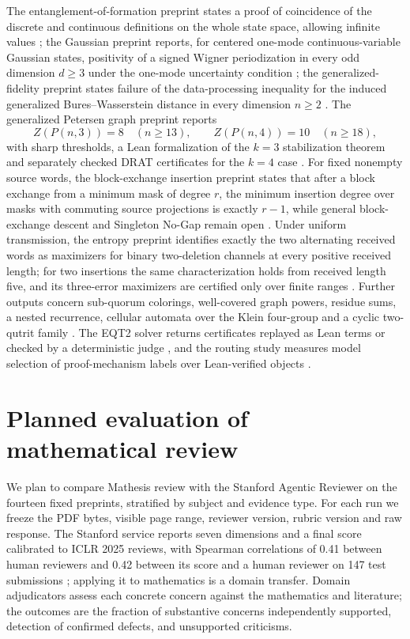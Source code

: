 \documentclass[11pt]{article}
\begin{document}
The entanglement-of-formation preprint states a proof of coincidence of the
discrete and continuous definitions on the whole state space, allowing
infinite values \citep{eof}; the Gaussian preprint reports, for centered
one-mode continuous-variable Gaussian states, positivity of a signed Wigner
periodization in every odd dimension $d\geq3$ under the one-mode uncertainty
condition \citep{gaussian}; the generalized-fidelity preprint states failure
of the data-processing inequality for the induced generalized
Bures--Wasserstein distance in every dimension $n\geq2$ \citep{fidelity}. The
generalized Petersen graph preprint reports
\begin{equation}
 Z(P(n,3))=8\quad(n\geq13),\qquad Z(P(n,4))=10\quad(n\geq18),
\end{equation}
with sharp thresholds, a Lean formalization of the $k=3$ stabilization theorem
and separately checked DRAT certificates for the $k=4$ case \citep{petersen}.
For fixed nonempty source words, the block-exchange insertion preprint states
that after a block exchange from a minimum mask of degree $r$, the minimum
insertion degree over masks with commuting source projections is exactly
$r-1$, while general block-exchange descent and Singleton No-Gap remain open
\citep{insertion}. Under uniform transmission, the entropy preprint identifies
exactly the two alternating received words as maximizers for binary
two-deletion channels at every positive received length; for two insertions
the same characterization holds from received length five, and its
three-error maximizers are certified only over finite ranges
\citep{entropy}. Further outputs concern sub-quorum colorings, well-covered
graph powers, residue sums, a nested recurrence, cellular automata over the
Klein four-group and a cyclic two-qutrit family
\citep{subquorum,wellcovered,residues,padovan,cellular,qutrit}. The EQT2
solver returns certificates replayed as Lean terms or checked by a
deterministic judge \citep{eqt2}, and the routing study measures model
selection of proof-mechanism labels over Lean-verified objects
\citep{routing}.

\section{Planned evaluation of mathematical review}
\label{app:study}
We plan to compare Mathesis review with the Stanford Agentic Reviewer on the
fourteen fixed preprints, stratified by subject and evidence type. For each
run we freeze the PDF bytes, visible page range, reviewer version, rubric
version and raw response. The Stanford service reports seven dimensions and
a final score calibrated to ICLR 2025 reviews, with Spearman correlations of
0.41 between human reviewers and 0.42 between its score and a human reviewer
on 147 test submissions \citep{stanford}; applying it to mathematics is a
domain transfer. Domain adjudicators assess each concrete concern against the
mathematics and literature; the outcomes are the fraction of substantive
concerns independently supported, detection of confirmed defects, and
unsupported criticisms.
\end{document}
